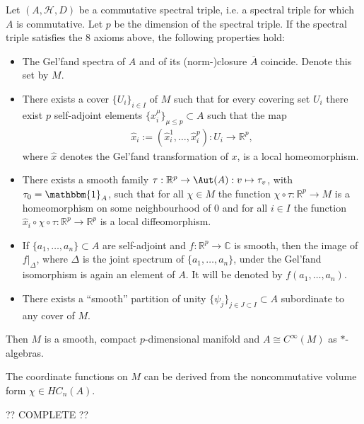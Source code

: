     \begin{construct}
        Let $(A,\mathcal{H},D)$ be a commutative spectral triple, i.e. a spectral triple for which $A$ is commutative. Let $p$ be the dimension of the spectral triple. If the spectral triple satisfies the 8 axioms above, the following properties hold:
        \begin{itemize}
            \item The Gel'fand spectra of $A$ and of its (norm-)closure $\overline{A}$ coincide. Denote this set by $M$.
            \item There exists a cover $\{U_i\}_{i\in I}$ of $M$ such that for every covering set $U_i$ there exist $p$ self-adjoint elements $\{x^\mu_i\}_{\mu\leq p}\subset A$ such that the map
            \begin{gather}
                \widehat{x}_i:=(\widehat{x}^1_i,\ldots,\widehat{x}^p_i):U_i\rightarrow\mathbb{R}^p,
            \end{gather}
            where $\widehat{x}$ denotes the Gel'fand transformation of $x$, is a local homeomorphism.
            \item There exists a smooth family $\tau:\mathbb{R}^p\rightarrow\Aut(A):v\mapsto\tau_v$, with $\tau_0=\mathbbm{1}_A$, such that for all $\chi\in M$ the function $\chi\circ\tau:\mathbb{R}^p\rightarrow M$ is a homeomorphism on some neighbourhood of 0 and for all $i\in I$ the function $\widehat{x}_i\circ\chi\circ\tau:\mathbb{R}^p\rightarrow\mathbb{R}^p$ is a local diffeomorphism.
            \item If $\{a_1,\ldots,a_n\}\subset A$ are self-adjoint and $f:\mathbb{R}^p\rightarrow\mathbb{C}$ is smooth, then the image of $f|_\Delta$, where $\Delta$ is the joint spectrum of $\{a_1,\ldots,a_n\}$, under the Gel'fand isomorphism is again an element of $A$. It will be denoted by $f(a_1,\ldots,a_n)$.
            \item There exists a ``smooth'' partition of unity $\{\psi_j\}_{j\in J\subset I}\subset A$ subordinate to any cover of $M$.
        \end{itemize}
        Then $M$ is a smooth, compact $p$-dimensional manifold and $A\cong C^\infty(M)$ as $\ast$-algebras.

        The coordinate functions on $M$ can be derived from the noncommutative volume form $\chi\in HC_n(A)$.

        ?? COMPLETE ??
    \end{construct}

